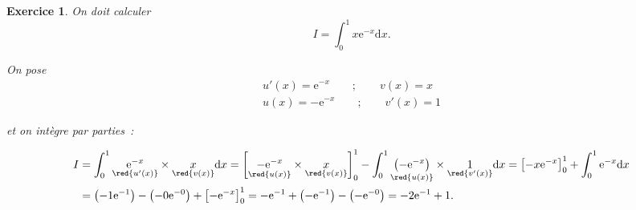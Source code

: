 \documentclass[10pt]{article}
\newtheorem{exo}{Exercice}
\begin{document}
\begin{exo}

On doit calculer
\[I=\int_0^{1}x\text{e}^{-x}\mathrm{d}x.\]

On pose
\begin{align*}
u'(x)=\text{e}^{-x}\qquad ;\qquad v(x)= x\\
u(x)=-\text{e}^{-x}\qquad ; \qquad v'(x)=1
\end{align*}

et on intègre par parties~:

\begin{align*}
I&=\int_0^1\underset{\red{u'(x)}}{\text{e}^{-x}}\times \underset{\red{v(x)}}{x}\mathrm{d}x=\left[\underset{\red{u(x)}}{-\text{e}^{-x}}\times\underset{\red{v(x)}}{x}\right]_0^{1}-\int_0^1\underset{\red{u(x)}}{\left(-\text{e}^{-x}\right)}\times \underset{\red{v'(x)}}{1}\mathrm{d}x
=\left[-x\text{e}^{-x}\right]_0^1+\int_0^{1}\text{e}^{-x}\mathrm{d}x\\
&=\left(-1\text{e}^{-1}\right)-\left(-0\text{e}^{-0}\right)+\left[-\text{e}^{-x}\right]_0^1
=-\text{e}^{-1}+\left(-\text{e}^{-1}\right)-\left(-\text{e}^{-0}\right)=-2\text{e}^{-1}+1.
\end{align*}

\end{exo}
\end{document}
